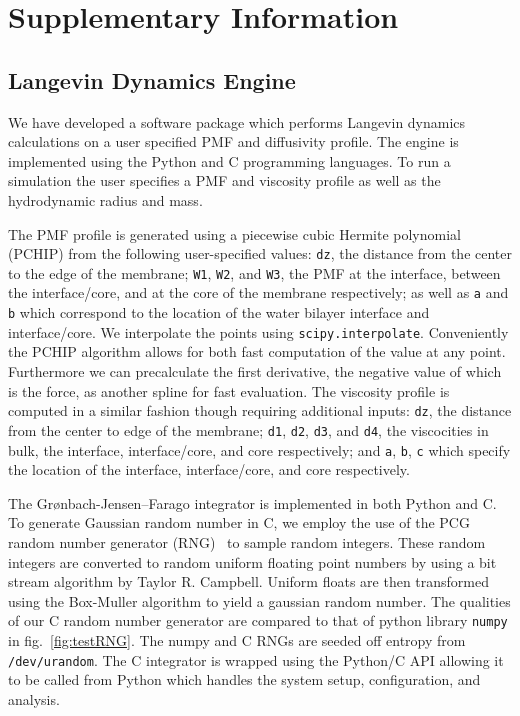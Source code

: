 
\section{Supplementary Information}
    \subsection{Langevin Dynamics Engine}
        \par We have developed a software package which performs Langevin dynamics calculations on a user specified PMF and diffusivity profile. The engine is implemented using the Python and C programming languages. To run a simulation the user specifies a PMF and viscosity profile as well as the hydrodynamic radius and mass.

        \par The PMF profile is generated using a piecewise cubic Hermite polynomial (PCHIP) from the following user-specified values: \texttt{dz}, the distance from the center to the edge of the membrane; \texttt{W1}, \texttt{W2}, and \texttt{W3}, the PMF at the interface, between the interface/core, and at the core of the membrane respectively; as well as \texttt{a} and \texttt{b} which correspond to the location of the water bilayer interface and interface/core.  We interpolate the points using \texttt{scipy.interpolate}. Conveniently the PCHIP algorithm allows for both fast computation of the value at any point. Furthermore we can precalculate the first derivative, the negative value of which is the force, as another spline for fast evaluation. The viscosity profile is computed in a similar fashion though requiring additional inputs: \texttt{dz}, the distance from the center to edge of the membrane; \texttt{d1}, \texttt{d2}, \texttt{d3}, and \texttt{d4}, the viscocities in bulk, the interface, interface/core, and core respectively; and \texttt{a}, \texttt{b}, \texttt{c} which specify the location of the interface, interface/core, and core respectively.

        \par The Gr\o nbach-Jensen--Farago integrator is implemented in both Python and C. To generate Gaussian random number in C, we employ the use of the PCG random number generator (RNG)~\cite{ONeill} to sample random integers. These random integers are converted to random uniform floating point numbers by using a bit stream algorithm by Taylor R. Campbell. Uniform floats are then transformed using the Box-Muller algorithm to yield a gaussian random number. The qualities of our C random number generator are compared to that of python library \texttt{numpy} in fig.~\ref{fig:testRNG}. The numpy and C RNGs are seeded off entropy from \texttt{/dev/urandom}. The C integrator is wrapped using the Python/C API allowing it to be called from Python which handles the system setup, configuration, and analysis.

